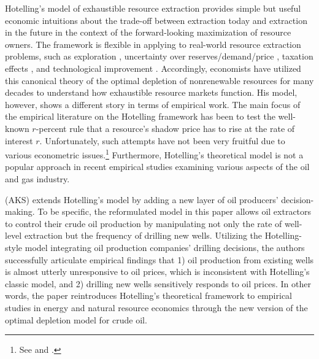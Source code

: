 Hotelling's model of exhaustible resource extraction provides simple but useful economic intuitions about the trade-off between extraction today and extraction in the future in the context of the forward-looking maximization of resource owners. The framework is flexible in applying to real-world resource extraction problems, such as exploration \citep{The-Optimal-Exploration-and-Production-of-Nonrenewable-Resources_Pindyck_1978, Optimal-Pricing-Use-and-Exploration-of-Uncertain-Natural-Resource-Stocks_Arrow-and-Chang_1982, Exploration-and-Exhaustible-Resources_The-Microfoundations-of-Aggregate-Models_Swierzbinski-and-Mendelsohn_1989, Exhaustible-Resources_A-Theory-of-Exploration_Quyen_1991}, uncertainty over reserves/demand/price \citep{Optimal-Depletion-of-an-Uncertain-Stock_Gilber_1979, Uncertainty-and-Exhaustible-Resource-Markets_Pindyck_1980, The-Optimal-Production-of-an-Exhaustible-Resource-When-Price-is-Exogenous-and-Stochastic_Pindyck_1981, Extraction-at-the-Intensive-Margin_Farrow-and-Krautkraemer_1989}, taxation effects \citep{Economics-of-Depletatble-Resources_Market-Forces-and-Intertemporal-Bias_Sweeney_1977, The-Taxation-of-Nonreplenishable-Natural-Resources-Revisited_Heaps_1985}, and technological improvement \citep{Growth-with-Exhaustible-Natural-Resources_Efficient-and-Optimal-Growth-Paths_Stiglitz_1974, Trends-in-Natural-Resource-Commodity-Prices_An-Analysis-of-the-Time-Domain_Slade_1982}. Accordingly, economists have utilized this canonical theory of the optimal depletion of nonrenewable resources for many decades to understand how exhaustible resource markets function. His model, however, shows a different story in terms of empirical work. The main focus of the empirical literature on the Hotelling framework has been to test the well-known $r$-percent rule that a resource's shadow price has to rise at the rate of interest $r$. Unfortunately, such attempts have not been very fruitful due to various econometric issues.\footnote{See \cite{Natural-Resource-Economics-under-the-Rule-of-Hotelling_Gaudet_2007} and \cite{Whither-Hotelling-Tests-of-the-Theory-of-Exhaustible-Resources_Slade-and-Thille_2009}.} Furthermore, Hotelling's theoretical model is not a popular approach in recent empirical studies examining various aspects of the oil and gas industry. 

\cite{Hotelling-under-Pressure_AKS_2018} (AKS) extends Hotelling's model by adding a new layer of oil producers' decision-making. To be specific, the reformulated model in this paper allows oil extractors to control their crude oil production by manipulating not only the rate of well-level extraction but the frequency of drilling new wells. Utilizing the Hotelling-style model integrating oil production companies' drilling decisions, the authors successfully articulate empirical findings that 1) oil production from existing wells is almost utterly unresponsive to oil prices, which is inconsistent with Hotelling's classic model, and 2) drilling new wells sensitively responds to oil prices. In other words, the paper reintroduces Hotelling's theoretical framework to empirical studies in energy and natural resource economics through the new version of the optimal depletion model for crude oil. 

